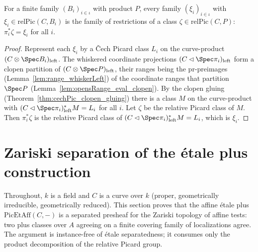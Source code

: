 \begin{theorem}
  \label{thm:relPic_pi_gluing}
  \leanok
  For a finite family \((B_i)_{i \in \iota}\) with product \(P\), every family
  \((\xi_i)_{i \in \iota}\) with \(\xi_i \in \mathrm{relPic}(C, B_i)\) is the family of restrictions
  of a class \(\zeta \in \mathrm{relPic}(C, P)\): \(\pi_i^{*}\zeta = \xi_i\) for all \(i\).
\end{theorem}
\begin{proof}
  \leanok
  Represent each \(\xi_i\) by a \v Cech Picard class \(L_i\) on the curve-product
  \((C \otimes \Spec B_i)_{\mathrm{left}}\). The whiskered coordinate projections
  \((C \lhd \Spec\pi_i)_{\mathrm{left}}\) form a clopen partition of
  \((C \otimes \Spec P)_{\mathrm{left}}\), their ranges being the \(\mathrm{pr}\)-preimages
  (Lemma~\ref{lem:range_whiskerLeft}) of the coordinate ranges that partition \(\Spec P\)
  (Lemma~\ref{lem:opensRange_eval_clopen}). By the clopen gluing
  (Theorem~\ref{thm:cechPic_clopen_gluing}) there is a class \(M\) on the curve-product with
  \((C \lhd \Spec\pi_i)_{\mathrm{left}}^{*} M = L_i\) for all \(i\). Let \(\zeta\) be the relative
  Picard class of \(M\). Then \(\pi_i^{*}\zeta\) is the relative Picard class of
  \((C \lhd \Spec\pi_i)_{\mathrm{left}}^{*} M = L_i\), which is \(\xi_i\).
\end{proof}

\section{Zariski separation of the \'etale plus construction}

Throughout, \(k\) is a field and \(C\) is a curve over \(k\) (proper, geometrically irreducible,
geometrically reduced). This section proves that the affine \'etale plus \(\mathrm{PicEtAff}(C, -)\)
is a separated presheaf for the Zariski topology of affine tests: two plus classes over \(A\)
agreeing on a finite covering family of localizations agree. The argument is instance-free of
\'etale separatedness; it consumes only the product decomposition of the relative Picard group.

